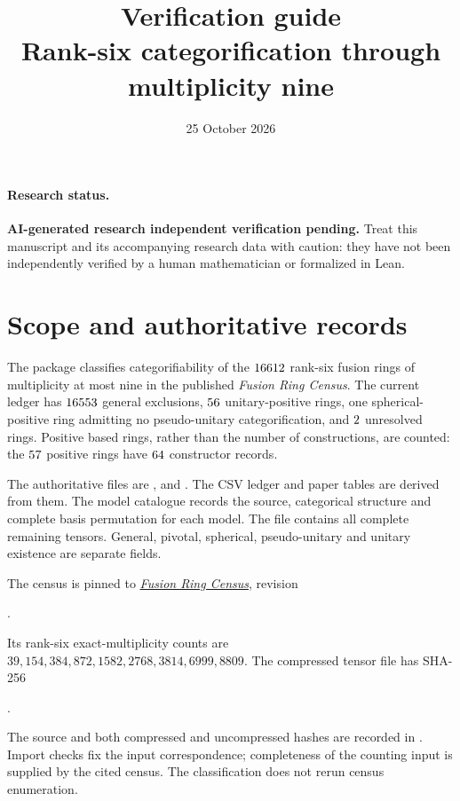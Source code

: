 \documentclass[11pt]{article}
\title{Verification guide\\\large Rank-six categorification through multiplicity nine}
\author{}\date{25 October 2026}
\begin{document}
\maketitle
\paragraph{Research status.} \textbf{AI-generated research \textperiodcentered{} independent verification pending.} Treat this manuscript and its accompanying research data with caution: they have not been independently verified by a human mathematician or formalized in Lean.

\section{Scope and authoritative records}
The package classifies categorifiability of the $16612$ rank-six
fusion rings of multiplicity at most nine in the published
\emph{Fusion Ring Census}. The current ledger has $16553$
general exclusions, $56$ unitary-positive rings, one
spherical-positive ring admitting no pseudo-unitary categorification,
and $2$ unresolved rings. Positive based rings, rather
than the number of constructions, are counted: the $57$
positive rings have $64$ constructor records.

The authoritative files are ,
 and
. The CSV ledger and paper
tables are derived from them. The model catalogue records the source,
categorical structure and complete basis permutation for each model.
The file  contains all
complete remaining tensors. General, pivotal, spherical,
pseudo-unitary and unitary existence are separate fields.

The census is pinned to
\href{https://github.com/sebastienpalcoux/fusion-ring-census}{\emph{Fusion Ring Census}},
revision
\begin{center}\small{}.\end{center}
Its rank-six exact-multiplicity counts are
$39,154,384,872,1582,2768,3814,6999,8809$.
The compressed tensor file  has
SHA-256
\begin{center}\small
{}.
\end{center}
The source and both compressed and uncompressed hashes are recorded in
. Import checks fix the
input correspondence; completeness of the counting input is supplied
by the cited census. The classification does not rerun census enumeration.
\end{document}
